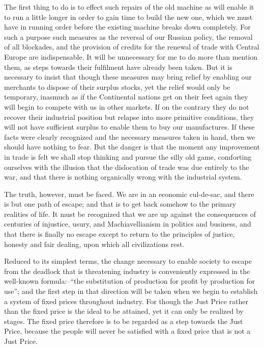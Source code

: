 \documentclass{book}
\begin{document}
The first thing to do is to effect such repairs of the old machine as will enable it to run a little longer in order to gain time to build the new one, which we must have in running order before the existing machine breaks down completely. For such a purpose such measures as the reversal of our Russian policy, the removal of all blockades, and the provision of credits for the renewal of trade with Central Europe are indispensable. It will be unnecessary for me to do more than mention them, as steps towards their fulfilment have already been taken. But it is necessary to insist that though these measures may bring relief by enabling our merchants to dispose of their surplus stocks, yet the relief would only be temporary, inasmuch as if the Continental nations get on their feet again they will begin to compete with us in other markets. If on the contrary they do not recover their industrial position but relapse into more primitive conditions, they will not have sufficient surplus to enable them to buy our manufactures. If these facts were clearly recognized and the necessary measures taken in hand, then we should have nothing to fear. But the danger is that the moment any improvement in trade is felt we shall stop thinking and pursue the silly old game, comforting ourselves with the illusion that the dislocation of trade was due entirely to the war, and that there is nothing organically wrong with the industrial system.

The truth, however, must be faced. We are in an economic cul-de-sac, and there is but one path of escape; and that is to get back somehow to the primary realities of life. It must be recognized that we are up against the consequences of centuries of injustice, usury, and Machiavellianism in politics and business, and that there is finally no escape except to return to the principles of justice, honesty and fair dealing, upon which all civilizations rest.

Reduced to its simplest terms, the change necessary to enable society to escape from the deadlock that is threatening industry is conveniently expressed in the well-known formula:–“the substitution of production for profit by production for use”; and the first step in that direction will be taken when we begin to establish a system of fixed prices throughout industry. For though the Just Price rather than the fixed price is the ideal to be attained, yet it can only be realized by stages. The fixed price therefore is to be regarded as a step towards the Just Price, because the people will never be satisfied with a fixed price that is not a Just Price.
\end{document}
